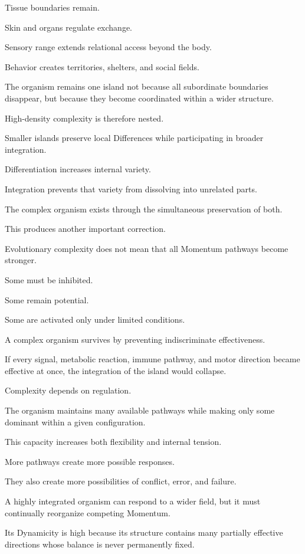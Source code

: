 Tissue boundaries remain.

Skin and organs regulate exchange.

Sensory range extends relational access beyond the body.

Behavior creates territories, shelters, and social fields.

The organism remains one island not because all subordinate boundaries disappear, but because they become coordinated within a wider structure.

High-density complexity is therefore nested.

Smaller islands preserve local Differences while participating in broader integration.

Differentiation increases internal variety.

Integration prevents that variety from dissolving into unrelated parts.

The complex organism exists through the simultaneous preservation of both.

This produces another important correction.

Evolutionary complexity does not mean that all Momentum pathways become stronger.

Some must be inhibited.

Some remain potential.

Some are activated only under limited conditions.

A complex organism survives by preventing indiscriminate effectiveness.

If every signal, metabolic reaction, immune pathway, and motor direction became effective at once, the integration of the island would collapse.

Complexity depends on regulation.

The organism maintains many available pathways while making only some dominant within a given configuration.

This capacity increases both flexibility and internal tension.

More pathways create more possible responses.

They also create more possibilities of conflict, error, and failure.

A highly integrated organism can respond to a wider field, but it must continually reorganize competing Momentum.

Its Dynamicity is high because its structure contains many partially effective directions whose balance is never permanently fixed.

